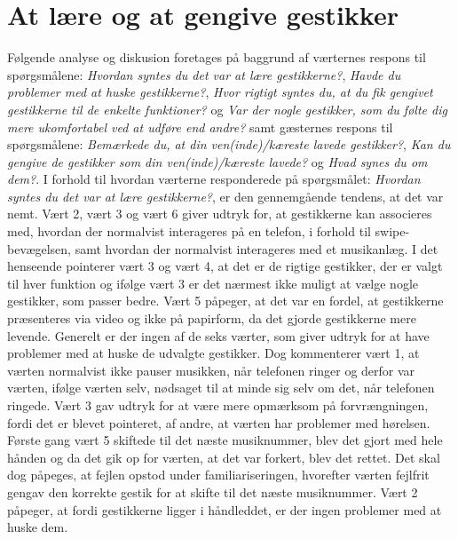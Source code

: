\section{At lære og at gengive gestikker}
\label{TestresultaterSocialAcceptGestikker}
%
Følgende analyse og diskusion foretages på baggrund af værternes respons til spørgsmålene: \textit{Hvordan syntes du det var at lære gestikkerne?}, \textit{Havde du problemer med at huske gestikkerne?}, \textit{Hvor rigtigt syntes du, at du fik gengivet gestikkerne til de enkelte funktioner?} og \textit{Var der nogle gestikker, som du følte dig mere ukomfortabel ved at udføre end andre?} samt gæsternes respons til spørgsmålene: \textit{Bemærkede du, at din ven(inde)/kæreste lavede gestikker?}, \textit{Kan du gengive de gestikker som din ven(inde)/kæreste lavede?} og \textit{Hvad synes du om dem?}.\blankline
%
I forhold til hvordan værterne responderede på spørgsmålet: \textit{Hvordan syntes du det var at lære gestikkerne?}, er den gennemgående tendens, at det var nemt. Vært 2, vært 3 og vært 6 giver udtryk for, at gestikkerne kan associeres med, hvordan der normalvist interageres på en telefon, i forhold til swipe-bevægelsen, samt hvordan der normalvist interageres med et musikanlæg. I det henseende pointerer vært 3 og vært 4, at det er de rigtige gestikker, der er valgt til hver funktion og ifølge vært 3 er det nærmest ikke muligt at vælge nogle gestikker, som passer bedre. Vært 5 påpeger, at det var en fordel, at gestikkerne præsenteres via video og ikke på papirform, da det gjorde gestikkerne mere levende. Generelt er der ingen af de seks værter, som giver udtryk for at have problemer med at huske de udvalgte gestikker. Dog kommenterer vært 1, at værten normalvist ikke pauser musikken, når telefonen ringer og derfor var værten, ifølge værten selv, nødsaget til at minde sig selv om det, når telefonen ringede. Vært 3 gav udtryk for at være mere opmærksom på forvrængningen, fordi det er blevet pointeret, af andre, at værten har problemer med hørelsen. Første gang vært 5 skiftede til det næste musiknummer, blev det gjort med hele hånden og da det gik op for værten, at det var forkert, blev det rettet. Det skal dog påpeges, at fejlen opstod under familiariseringen, hvorefter værten fejlfrit gengav den korrekte gestik for at skifte til det næste musiknummer. Vært 2 påpeger, at fordi gestikkerne ligger i håndleddet, er der ingen problemer med at huske dem. 

